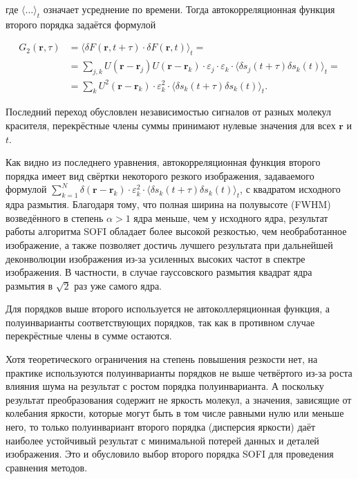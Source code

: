 \noindent где $\langle \ldots \rangle_t$ означает усреднение по времени. Тогда автокорреляционная функция второго порядка задаётся формулой

\begin{align*}
	G_2\left(\mathbf{r},\tau\right) &= \langle \delta F\left(\mathbf{r},t+\tau\right)\cdot\delta F\left(\mathbf{r},t\right) \rangle_t = \\
	&= \sum_{j,k} {U\left(\mathbf{r}-\mathbf{r}_j\right)U\left(\mathbf{r}-\mathbf{r}_k\right)\cdot\varepsilon_j\cdot\varepsilon_k\cdot \langle \delta s_j\left(t+\tau\right)\delta s_k\left(t\right) \rangle_t} = \\
	&= \sum_{k} {U^2\left(\mathbf{r}-\mathbf{r}_k\right)\cdot\varepsilon_k^2\cdot \langle \delta s_k\left(t+\tau\right)\delta s_k\left(t\right) \rangle_t}.
\end{align*}

Последний переход обусловлен независимостью сигналов от разных молекул красителя, перекрёстные члены суммы принимают нулевые значения для всех $\mathbf{r}$ и $t$.

Как видно из последнего уравнения, автокорреляционная функция второго порядка имеет вид свёртки некоторого резкого изображения, задаваемого формулой $\sum_{k=1}^{N} {\delta(\mathbf{r}-\mathbf{r}_k)\cdot\varepsilon_k^2\cdot \langle \delta s_k\left(t+\tau\right)\delta s_k\left(t\right) \rangle_t}$, с квадратом исходного ядра размытия. Благодаря тому, что полная ширина на полувысоте (FWHM) возведённого в степень $\alpha>1$ ядра меньше, чем у исходного ядра, результат работы алгоритма SOFI обладает более высокой резкостью, чем необработанное изображение, а также позволяет достичь лучшего результата при дальнейшей деконволюции изображения из-за усиленных высоких частот в спектре изображения. В частности, в случае гауссовского размытия квадрат ядра размытия в $\sqrt{2}$ раз уже самого ядра.

Для порядков выше второго используется не автоколлеряционная функция, а полуинварианты соответствующих порядков, так как в противном случае перекрёстные члены в сумме остаются.

Хотя теоретического ограничения на степень повышения резкости нет, на практике используются полуинварианты порядков не выше четвёртого из-за роста влияния шума на результат с ростом порядка полуинварианта. А поскольку результат преобразования содержит не яркость молекул, а значения, зависящие от колебания яркости, которые могут быть в том числе равными нулю или меньше него, то только полуинвариант второго порядка (дисперсия яркости) даёт наиболее устойчивый результат с минимальной потерей данных и деталей изображения. Это и обусловило выбор второго порядка SOFI для проведения сравнения методов.

